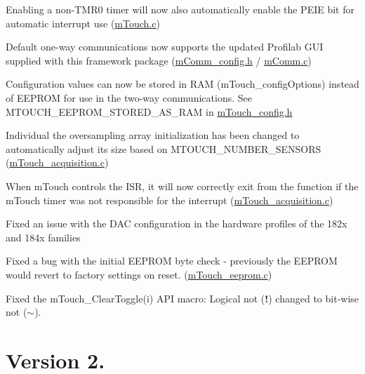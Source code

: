 \begin{DoxyItemize}
\item Enabling a non-\/\+T\+M\+R0 timer will now also automatically enable the P\+E\+I\+E bit for automatic interrupt use (\hyperlink{m_touch_8c}{m\+Touch.\+c}) \item Default one-\/way communications now supports the updated Profilab G\+U\+I supplied with this framework package (\hyperlink{m_comm__config_8h}{m\+Comm\+\_\+config.\+h} / \hyperlink{m_comm_8c}{m\+Comm.\+c}) \item Configuration values can now be stored in R\+A\+M (m\+Touch\+\_\+config\+Options) instead of E\+E\+P\+R\+O\+M for use in the two-\/way communications. See M\+T\+O\+U\+C\+H\+\_\+\+E\+E\+P\+R\+O\+M\+\_\+\+S\+T\+O\+R\+E\+D\+\_\+\+A\+S\+\_\+\+R\+A\+M in \hyperlink{m_touch__config_8h}{m\+Touch\+\_\+config.\+h} \item Individual the oversampling array initialization has been changed to automatically adjust its size based on M\+T\+O\+U\+C\+H\+\_\+\+N\+U\+M\+B\+E\+R\+\_\+\+S\+E\+N\+S\+O\+R\+S (\hyperlink{m_touch__acquisition_8c}{m\+Touch\+\_\+acquisition.\+c}) \item When m\+Touch controls the I\+S\+R, it will now correctly exit from the function if the m\+Touch timer was not responsible for the interrupt (\hyperlink{m_touch__acquisition_8c}{m\+Touch\+\_\+acquisition.\+c}) \item Fixed an issue with the D\+A\+C configuration in the hardware profiles of the 182x and 184x families \item Fixed a bug with the initial E\+E\+P\+R\+O\+M byte check -\/ previously the E\+E\+P\+R\+O\+M would revert to factory settings on reset. (\hyperlink{m_touch__eeprom_8c}{m\+Touch\+\_\+eeprom.\+c}) \item Fixed the m\+Touch\+\_\+\+Clear\+Toggle(i) A\+P\+I macro\+: Logical \textquotesingle{}not\textquotesingle{} ({\bfseries !}) changed to bit-\/wise \textquotesingle{}not\textquotesingle{} ({\bfseries $\sim$}).\end{DoxyItemize}
\hypertarget{_changelog_cl0200}{}\section{Version 2.}\label{_changelog_cl0200}
